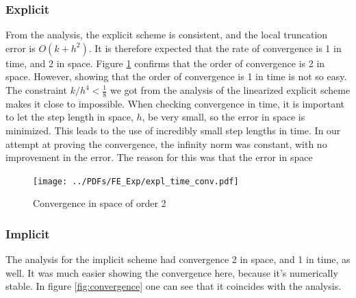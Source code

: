 \subsubsection{Explicit}
From the analysis, the explicit scheme is consistent, and the local truncation error is $O(k + h^2)$. It is therefore expected that the rate of convergence is 1 in time, and 2 in space. Figure \ref{fig:convFE_time} confirms that the order of convergence is 2 in space. However, showing that the order of convergence is 1 in time is not so easy. The constraint $k/h^4 < \frac{1}{8}$ we got from the analysis of the linearized explicit scheme makes it close to impossible. When checking convergence in time, it is important to let the step length in space, $h$, be very small, so the error in space is minimized. This leads to the use of incredibly small step lengths in time. In our attempt at proving the convergence, the infinity norm was constant, with no improvement in the error. The reason for this was that the error in space 

 
\begin{figure}[H]
\centering
\texttt{[image: ../PDFs/FE\_Exp/expl\_time\_conv.pdf]}
\caption{Convergence in space of order 2}
\label{fig:convFE_time}
\end{figure} 

\subsubsection{Implicit}
The analysis for the implicit scheme had convergence 2 in space, and 1 in time, as well. It was much easier showing the convergence here, because it's numerically stable. In figure \ref{fig:convergence} one can see that it coincides with the analysis.

